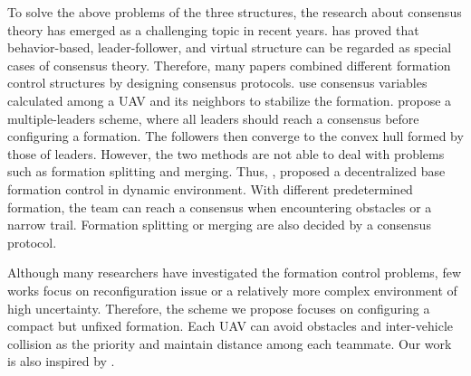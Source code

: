 To solve the above problems of the three structures, the research about consensus theory has emerged as a challenging topic in recent years. \citet{ren2007consensus} has proved that behavior-based, leader-follower, and virtual structure can be regarded as special cases of consensus theory. Therefore, many papers combined different formation control structures by designing consensus protocols. \citet{7419717} use consensus variables calculated among a UAV and its neighbors to stabilize the formation. \citet{8295262} propose a multiple-leaders scheme, where all leaders should reach a consensus before configuring a formation. The followers then converge to the convex hull formed by those of leaders. However, the two methods are not able to deal with problems such as formation splitting and merging. Thus, \citet{7487747}, \citet{8793765} proposed a decentralized base formation control in dynamic environment. With different predetermined formation, the team can reach a consensus when encountering obstacles or a narrow trail. Formation splitting or merging are also decided by a consensus protocol.

Although many researchers have investigated the formation control problems, few works focus on reconfiguration issue or a relatively more complex environment of high uncertainty. Therefore, the scheme we propose focuses on configuring a compact but unfixed formation. Each UAV can avoid obstacles and inter-vehicle collision as the priority and maintain distance among each teammate. Our work is also inspired by \citep{5069925}.